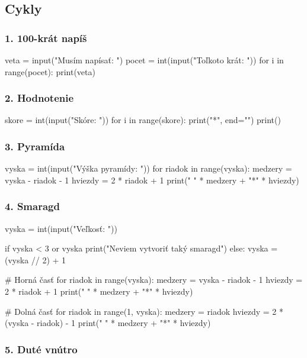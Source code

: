 \subsection{Cykly}

\subsubsection*{1. 100-krát napíš}
\begin{solution}
veta = input("Musím napísať: ")
pocet = int(input("Toľkoto krát: "))
for i in range(pocet):
    print(veta)
\end{solution}

\subsubsection*{2. Hodnotenie}
\begin{solution}
skore = int(input("Skóre: "))
for i in range(skore):
    print("*", end="")
print()
\end{solution}


\subsubsection*{3. Pyramída}
\begin{solution}
vyska = int(input("Výška pyramídy: "))
for riadok in range(vyska):
    medzery = vyska - riadok - 1
    hviezdy = 2 * riadok + 1
    print(" " * medzery + "*" * hviezdy)
\end{solution}

\subsubsection*{4. Smaragd}
\begin{solution}
vyska = int(input("Veľkosť: "))

if vyska < 3 or vyska %
    print("Neviem vytvoriť taký smaragd")
else:
    vyska = (vyska // 2) + 1

    # Horná časť
    for riadok in range(vyska):
        medzery = vyska - riadok - 1
        hviezdy = 2 * riadok + 1
        print(" " * medzery + "*" * hviezdy)

    # Dolná časť
    for riadok in range(1, vyska):
        medzery = riadok
        hviezdy = 2 * (vyska - riadok) - 1
        print(" " * medzery + "*" * hviezdy)
\end{solution}


\subsubsection*{5. Duté vnútro}


